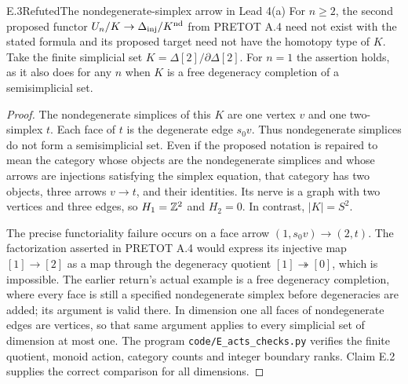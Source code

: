 \begin{claim}{E.3}{Refuted}{The nondegenerate-simplex arrow in Lead 4(a)}
\label{E:ndcounter}
For $n\geq2$, the second proposed functor
$U_n/K\to\Delta_{\rm inj}/K^{\rm nd}$ from PRETOT A.4 need not
exist with the stated formula and its proposed target need not have
the homotopy type of $K$. Take the finite simplicial set
$K=\Delta[2]/\partial\Delta[2]$.
For $n=1$ the assertion holds, as it also does for any $n$ when $K$
is a free degeneracy completion of a semisimplicial set.
\end{claim}
\begin{proof}
The nondegenerate simplices of this $K$ are one vertex $v$ and one
two-simplex $t$. Each face of $t$ is the degenerate edge $s_0v$.
Thus nondegenerate simplices do not form a semisimplicial set. Even
if the proposed notation is repaired to mean the category whose
objects are the nondegenerate simplices and whose arrows are
injections satisfying the simplex equation, that category has two
objects, three arrows $v\to t$, and their identities. Its nerve
is a graph with two vertices and three edges, so $H_1=\mathbb Z^2$ and
$H_2=0$. In contrast, $|K|=S^2$.

The precise functoriality failure occurs on a face arrow
$(1,s_0v)\to(2,t)$. The factorization asserted in PRETOT A.4
would express its injective map $[1]\to[2]$ as a map through the
degeneracy quotient $[1]\twoheadrightarrow[0]$, which is impossible.
The earlier return's actual example is a free degeneracy completion,
where every face is still a specified nondegenerate simplex before
degeneracies are added; its argument is valid there. In dimension
one all faces of nondegenerate edges are vertices, so that same
argument applies to every simplicial set of dimension at most one.
The program \texttt{code/E\_acts\_checks.py} verifies the finite
quotient, monoid action, category counts and integer boundary ranks.
Claim E.2 supplies the correct comparison for all dimensions.
\end{proof}

